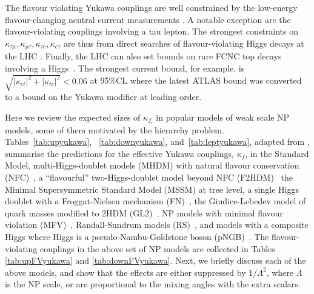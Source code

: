 \documentclass[../report.tex]{subfiles}
\begin{document}
The flavour violating Yukawa couplings are well constrained by the low-energy
flavour-changing neutral current measurements
\cite{Harnik:2012pb,Blankenburg:2012ex,Gorbahn:2014sha}. A notable
exception are the flavour-violating couplings involving a tau lepton. The
strongest constraints on $\kappa_{\tau\mu}, \kappa_{\mu\tau},
\kappa_{\tau e}, \kappa_{e \tau}$ are thus from direct searches of flavour-violating Higgs decays at
the LHC \cite{Sirunyan:2017xzt,Aad:2016blu}.
Finally, the LHC can also set bounds on rare FCNC top decays involving a Higgs~\cite{Aaboud:2017mfd,Khachatryan:2016atv,Aad:2015pja,Aad:2014dya}. The strongest current bound, for example, is $\sqrt{|\kappa_{ct}|^2+|\kappa_{tc}|^2}<0.06$ at 95\%CL where the latest ATLAS bound was converted to a bound on the Yukawa modifier at leading order.



Here we review the expected sizes of $\kappa_{f_i}$ in popular models of weak scale NP models, some of them motivated by the hierarchy problem. 
Tables~\ref{tab:upyukawa}, ~\ref{tab:downyukawa},
and~\ref{tab:leptyukawa}, adapted from
\cite{Bishara:2015cha,Dery:2014kxa,Dery:2013aba,Dery:2013rta,Bauer:2015kzy},
summarise the predictions for the effective Yukawa couplings,
$\kappa_f$, in the Standard Model, multi-Higgs-doublet models
(MHDM) with natural flavour conservation (NFC)~\cite{Glashow:1976nt,
  Paschos:1976ay}, a ``flavourful'' two-Higgs-doublet model beyond NFC
(F2HDM)~\cite{Altmannshofer:2015esa, Altmannshofer:2016zrn, 
Altmannshofer:2017uvs, Altmannshofer:2018bch} the Minimal Supersymmetric Standard Model (MSSM) at tree level, 
a single Higgs doublet with
a Froggat-Nielsen mechanism (FN)~\cite{Froggatt:1978nt}, the
Giudice-Lebedev model of quark masses modified to 2HDM
(GL2)~\cite{Giudice:2008uua}, NP models with minimal flavour violation
(MFV)~\cite{D'Ambrosio:2002ex}, Randall-Sundrum models
(RS)~\cite{Randall:1999ee}, and models with a composite Higgs where
Higgs is a pseudo-Nambu-Goldstone boson (pNGB)~\cite{Dugan:1984hq,
  Georgi:1984ef, Kaplan:1983sm, Kaplan:1983fs}. The flavour-violating
couplings in the above set of NP models are collected in Tables
\ref{tab:upFVyukawa} and \ref{tab:downFVyukawa}. Next, we briefly
discuss each of the above models, and show that the effects are either
suppressed by $1/\Lambda^2$, where $\Lambda$ is the NP scale, or are
proportional to the mixing angles with the extra scalars.
\end{document}
